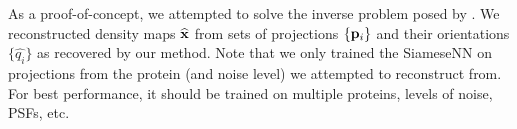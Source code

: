 
As a proof-of-concept, we attempted to solve the inverse problem posed by .
We reconstructed density maps $\widehat{\mathbf{x}}$ from sets of projections $\{ \mathbf{p}_i \}$ and their orientations $\{ \widehat{q_i} \}$ as recovered by our method.
Note that we only trained the SiameseNN  on projections from the protein (and noise level) we attempted to reconstruct from.
For best performance, it should be trained on multiple proteins, levels of noise, PSFs, etc.

